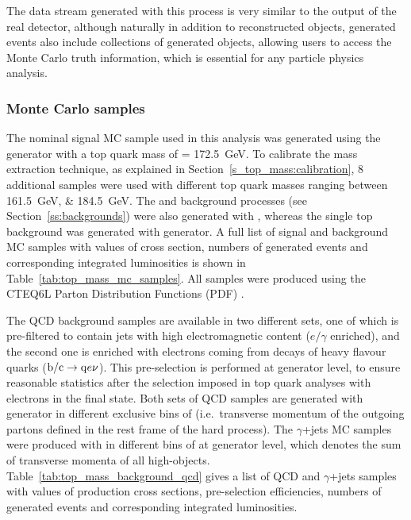 The data stream generated with this process is very similar to the output of the real detector, although naturally in
addition to reconstructed objects, generated events also include collections of generated objects, allowing users to
access the Monte Carlo truth information, which is essential for any particle physics analysis.

\subsubsection{Monte Carlo samples}
\label{sss_top_mass:mc_samples}

The nominal signal \ttbar MC sample used in this analysis was generated using the \MADGRAPH generator with a top quark
mass of \mtop = \SI{172.5}{\GeV}. To calibrate the mass extraction technique, as explained in
Section~\ref{s_top_mass:calibration}, 8 additional \ttbar samples were used with different top quark masses ranging
between \SIlist{161.5;184.5}{\GeV}. The \WpJets and \ZpJets background processes (see Section~\ref{ss:backgrounds}) were
also generated with \MADGRAPH, whereas the single top background was generated with \POWHEG generator. A full list of
signal \ttbar and background MC samples with values of cross section, numbers of generated events and corresponding
integrated luminosities is shown in Table~\ref{tab:top_mass_mc_samples}. All samples were produced using the CTEQ6L
Parton Distribution Functions (PDF) \autocite{CTEQ}.

The QCD background samples are available in two different sets, one of which is pre-filtered to contain jets with high
electromagnetic content ($e/\gamma$ enriched), and the second one is enriched with electrons coming from decays of heavy
flavour quarks ($\mathrm{b}/\mathrm{c} \rightarrow \mathrm{q} e\nu$). This pre-selection is performed at generator level, to ensure
reasonable statistics after the \ttbar selection imposed in top quark analyses with electrons in the final state. Both
sets of QCD samples are generated with \PYTHIA generator in different exclusive bins of \pthat (i.e.\ transverse
momentum of the outgoing partons defined in the rest frame of the hard process). The $\gamma$+jets MC samples were
produced with \MADGRAPH in different bins of \HT at generator level, which denotes the sum of transverse momenta of all
high-\pt objects. Table~\ref{tab:top_mass_background_qcd} gives a list of QCD and $\gamma$+jets samples with values of
production cross sections, pre-selection efficiencies, numbers of generated events and corresponding integrated
luminosities.

